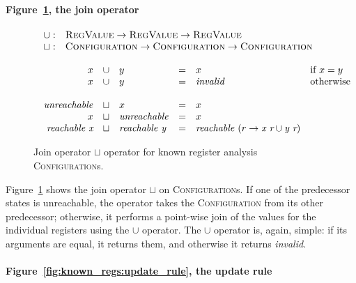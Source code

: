 \paragraph{Figure~\ref{fig:known_regs:join_op}, the join operator}

\begin{figure}
  \begin{displaymath}
    \begin{array}{l}
      \begin{array}{rl}
        \cup : & \textsc{RegValue} \rightarrow \textsc{RegValue} \rightarrow \textsc{RegValue} \\
        \sqcup : & \textsc{Configuration} \rightarrow \textsc{Configuration} \rightarrow \textsc{Configuration}
      \end{array}\\\\
      \begin{array}{rclcll}
        x & \cup & y & = & x                & \textrm{if } x = y\\
        x & \cup & y & = & \mathit{invalid} & \textrm{otherwise} \\
        \\
        \mathit{unreachable} & \sqcup & x & = & x \\
        x & \sqcup & \mathit{unreachable} & = & x \\
        \textit{reachable x} & \sqcup & \textit{reachable y} & = & \textit{reachable } (r \rightarrow \textit{x r} \cup \textit{y r})
      \end{array}
    \end{array}
  \end{displaymath}
  \caption{Join operator $\sqcup$ operator for known register analysis \textsc{Configuration}s.}
  \label{fig:known_regs:join_op}
\end{figure}

Figure~\ref{fig:known_regs:join_op} shows the join operator $\sqcup$
on \textsc{Configuration}s.  If one of the predecessor states is
unreachable, the operator takes the \textsc{Configuration} from its
other predecessor; otherwise, it performs a point-wise join of the
values for the individual registers using the $\cup$ operator.  The
$\cup$ operator is, again, simple: if its arguments are equal, it
returns them, and otherwise it returns \textit{invalid}.

\paragraph{Figure~\ref{fig:known_regs:update_rule}, the update rule}

